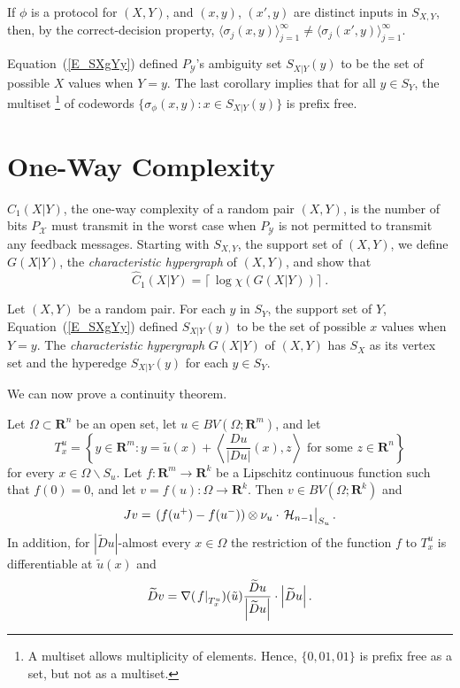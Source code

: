 \documentclass[mlq,fleqn]{w-art}
\newcommand{\st}{\sigma}
\newcommand{\XcY}{{(X,Y)}}
\newcommand{\SX}{{S_X}}
\newcommand{\SY}{{S_Y}}
\newcommand{\SXY}{{S_{X,Y}}}
\newcommand{\SXgYy}{{S_{X|Y}(y)}}
\newcommand{\Cw}[1]{{\hat C_#1(X|Y)}}
\newcommand{\G}{{G(X|Y)}}
\newcommand{\PY}{{P_{\mathcal{Y}}}}
\newcommand{\X}{\mathcal{X}}
\newcommand{\wt}{\widetilde}
\newcommand{\eval}[2][\right]{\relax
  \ifx#1\right\relax \left.\fi#2#1\rvert}
\newcommand{\envert}[1]{\left\lvert#1\right\rvert}
\let\abs=\envert
\begin{document}
If $\phi$ is a protocol for $(X,Y)$, and $(x,y)$, $(x',y)$ are distinct
inputs in $\SXY$, then, by the correct-decision property,
$\langle\st_j(x,y)\rangle_{j=1}^\infty\ne\langle
\st_j(x',y)\rangle_{j=1}^\infty$.

Equation~(\ref{E_SXgYy}) defined $\PY$'s ambiguity set $\SXgYy$
to be the set of possible $X$ values when $Y=y$.
The last corollary implies that for all $y\in\SY$,
the multiset%
\footnote{A multiset allows multiplicity of elements.
Hence, $\{0,01,01\}$ is prefix free as a set, but not as a multiset.}
of codewords $\{\st_\phi(x,y):x\in\SXgYy\}$ is prefix free.

\section{One-Way Complexity}
\label{S_Cp1}

$\Cw1$, the one-way complexity of a random pair $\XcY$,
is the number of bits $P_\X$ must transmit in the worst case
when $\PY$ is not permitted to transmit any feedback messages.
Starting with $\SXY$, the support set of $\XcY$, we define $\G$,
the \textit{characteristic hypergraph} of $\XcY$, and show that
\[
\Cw1=\lceil\,\log\chi(\G)\rceil\ .
\]

Let $\XcY$ be a random pair. For each $y$ in $\SY$, the support set of
$Y$, Equation~(\ref{E_SXgYy}) defined $\SXgYy$ to be the set of possible
$x$ values when $Y=y$. The \textit{characteristic hypergraph} $\G$ of
$\XcY$ has $\SX$ as its vertex set and the hyperedge $\SXgYy$ for each
$y\in\SY$.

We can now prove a continuity theorem.
\begin{thm}\label{t:conl}
Let $\Omega \subset\mathbf{R}^n$ be an open set, let
$u\in BV(\Omega ;\mathbf{R}^m)$, and let
\begin{equation}\label{quts}
T^u_x=\left\{y\in\mathbf{R}^m:
 y=\tilde u(x)+\left\langle \frac{Du}{\abs{Du}}(x),z
\right\rangle \text{ for some }z\in\mathbf{R}^n\right\}
\end{equation}
for every $x\in\Omega \backslash S_u$. Let $f\colon \mathbf{R}^m\to
\mathbf{R}^k$ be a Lipschitz continuous function such that $f(0)=0$, and
let $v=f(u)\colon \Omega \to \mathbf{R}^k$. Then $v\in BV(\Omega
;\mathbf{R}^k)$ and
\begin{equation}
Jv=\eval{(f(u^+)-f(u^-))\otimes \nu_u\cdot\,
\mathcal{H}_{n-1}}_{S_u}.
\end{equation}
In addition, for $\abs{\wt{D}u}$-almost every $x\in\Omega $ the
restriction of the function $f$ to $T^u_x$ is differentiable at $\tilde
u(x)$ and
\begin{equation}
\wt{D}v=\nabla (\eval{f}_{T^u_x})(\tilde u)
\frac{\wt{D}u}{\abs{\wt{D}u}}\cdot\abs{\wt{D}u}.\end{equation}
\end{thm}
\end{document}

